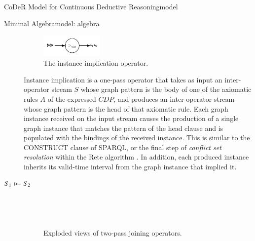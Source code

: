 \begin{nestedsection}{CoDeR Model for Continuous Deductive Reasoning}{model}
\begin{nestedsection}{Minimal Algebra}{model: algebra}
\begin{description}
\begin{figure}[b]
					\includegraphics[width=0.3\textwidth]{instance-implication}
					\caption{The instance implication operator.}
				\end{figure}
				Instance implication is a one-pass operator that takes as input an inter-operator stream $S$ whose graph pattern is the body of one of the axiomatic rules $A$ of the expressed ${CDP}$, and produces an inter-operator stream whose graph pattern is the head of that axiomatic rule.
				Each graph instance received on the input stream causes the production of a single graph instance that matches the pattern of the head clause and is populated with the bindings of the received instance.
				This is similar to the CONSTRUCT clause of SPARQL, or the final step of \emph{conflict set resolution} within the Rete algorithm \citep{forgy79}.
				In addition, each produced instance inherits its valid-time interval from the graph instance that implied it.
			\item[${S_1\,\rstreamjoin\,S_2}$] \hfill \\
				\begin{figure}[t]
					\centering
					\\
					\caption{Exploded views of two-pass joining operators.}
				\end{figure}

\end{description}
\end{nestedsection}
\end{nestedsection}
